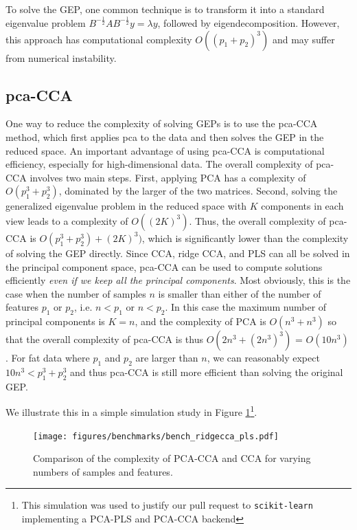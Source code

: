 To solve the GEP, one common technique is to transform it into a standard eigenvalue problem \( B^{-\frac{1}{2}} A B^{-\frac{1}{2}} y = \lambda y \), followed by eigendecomposition.
However, this approach has computational complexity \( O((p_1+p_2)^3) \) and may suffer from numerical instability.

\subsection{\acrshort{pca}-CCA}

One way to reduce the complexity of solving GEPs is to use the \acrshort{pca}-CCA method, which first applies \acrshort{pca} to the data and then solves the GEP in the reduced space.
An important advantage of using \acrshort{pca}-CCA is computational efficiency, especially for high-dimensional data.
The overall complexity of \acrshort{pca}-CCA involves two main steps.
First, applying PCA has a complexity of \( O(p_1^3+ p_2^3) \), dominated by the larger of the two matrices.
Second, solving the generalized eigenvalue problem in the reduced space with \( K \) components in each view leads to a complexity of \( O((2K)^3) \).
Thus, the overall complexity of \acrshort{pca}-CCA is \( O(p_1^3+ p_2^3) + (2K)^3) \), which is significantly lower than the complexity of solving the GEP directly.
Since CCA, ridge CCA, and PLS can all be solved in the principal component space, \acrshort{pca}-CCA can be used to compute solutions efficiently \textit{even if we keep all the principal components}.
Most obviously, this is the case when the number of samples \( n \) is smaller than either of the number of features \( p_1 \) or \( p_2 \), i.e. \( n < p_1 \) or \( n < p_2 \).
In this case the maximum number of principal components is \( K=n \), and the complexity of PCA is \( O(n^3+ n^3) \) so that the overall complexity of \acrshort{pca}-CCA is thus \( O(2n^3+(2n^3)^3) \) = \( O(10n^3) \).
For fat data where \( p_1 \) and \( p_2 \) are larger than \( n \), we can reasonably expect $10n^3<p_1^3+ p_2^3$ and thus \acrshort{pca}-CCA is still more efficient than solving the original GEP.

We illustrate this in a simple simulation study in Figure \ref{fig:pca-cca-complexity}\footnote{This simulation was used to justify our pull request to \texttt{scikit-learn}\citep{pedregosa2011scikit} implementing a PCA-PLS and PCA-CCA backend}.

\begin{figure}
    \centering
    \texttt{[image: figures/benchmarks/bench\_ridgecca\_pls.pdf]}
    \caption{Comparison of the complexity of PCA-CCA and CCA for varying numbers of samples and features.}
    \label{fig:pca-cca-complexity}
\end{figure}

